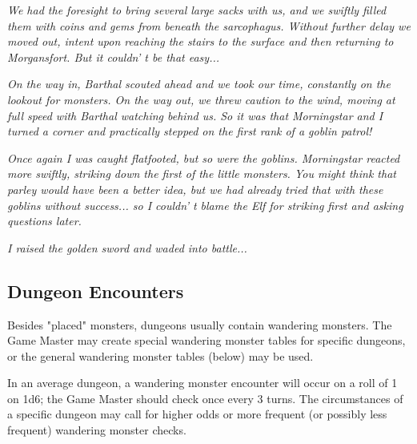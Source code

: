 \documentclass[a4paper,twoside,openany,10pt]{book}
\begin{document}
\textit{We had the foresight to bring several large sacks with us, and we swiftly filled them with coins and gems from beneath the sarcophagus. Without further delay we moved out, intent upon reaching the stairs to the surface and then returning to Morgansfort. But it couldn' t be that easy...}

\textit{On the way in, Barthal scouted ahead and we took our time, constantly on the lookout for monsters. On the way out, we threw caution to the wind, moving at full speed with Barthal watching behind us. So it was that Morningstar and I turned a corner and practically stepped on the first rank of a goblin patrol!}

\textit{Once again I was caught flatfooted, but so were the goblins. Morningstar reacted more swiftly, striking down the first of the little monsters. You might think that parley would have been a better idea, but we had already tried that with these goblins without success... so I couldn' t blame the Elf for striking first and asking questions later.}

\textit{I raised the golden sword and waded into battle...}

\subsection{Dungeon Encounters}\label{dungeon-encounters}

Besides "placed" monsters, dungeons usually contain wandering monsters. The Game Master may create special wandering monster tables for specific dungeons, or the general wandering monster tables (below) may be used. 

In an average dungeon, a wandering monster encounter will occur on a roll of 1 on 1d6; the Game Master should check once every 3 turns. The circumstances of a specific dungeon may call for higher odds or more frequent (or possibly less frequent) wandering monster checks.\medskip
\end{document}
